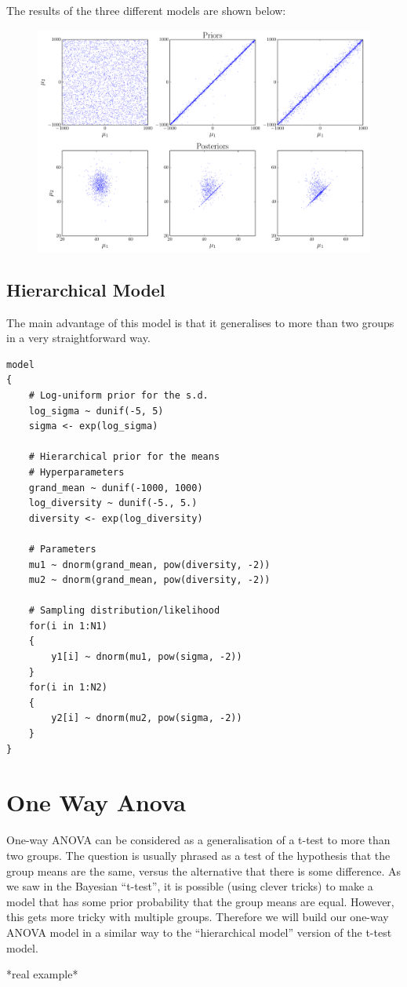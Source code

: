 The results of the three different models are shown below:
\begin{figure}
\begin{center}
\includegraphics[scale=0.6]{Figures/ttest.pdf}
\end{center}
\end{figure}


\subsection{Hierarchical Model}
The main advantage of this model is that it generalises to more than two groups
in a very straightforward way.
\begin{framed}
\begin{verbatim}
model
{
    # Log-uniform prior for the s.d.
    log_sigma ~ dunif(-5, 5)
    sigma <- exp(log_sigma)

    # Hierarchical prior for the means
    # Hyperparameters
    grand_mean ~ dunif(-1000, 1000)
    log_diversity ~ dunif(-5., 5.)
    diversity <- exp(log_diversity)

    # Parameters
    mu1 ~ dnorm(grand_mean, pow(diversity, -2))
    mu2 ~ dnorm(grand_mean, pow(diversity, -2))

    # Sampling distribution/likelihood
    for(i in 1:N1)
    {
        y1[i] ~ dnorm(mu1, pow(sigma, -2))
    }
    for(i in 1:N2)
    {
        y2[i] ~ dnorm(mu2, pow(sigma, -2))
    }
}

\end{verbatim}
\end{framed}



\section{One Way Anova}
One-way ANOVA can be considered as a generalisation of a t-test to more than
two groups. The question is usually phrased as a test of the hypothesis that
the group means are the same, versus the alternative that there is some difference.
As we saw in the Bayesian ``t-test'', it is possible (using clever tricks) to
make a model that has some prior probability that the group means are equal.
However, this gets more tricky with multiple groups. Therefore we will build our
one-way ANOVA model in a similar way to the ``hierarchical model'' version of the
t-test model.

*real example*




